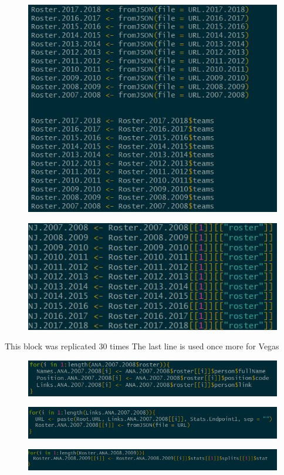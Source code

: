 \documentclass{beamer}
\begin{document}
\begin{frame}
\begin{figure}
	\includegraphics[width=0.7\linewidth]{Images/Block2}
\end{figure}

\end{frame}

\begin{frame}
\begin{figure}
	\includegraphics[width=0.7\linewidth]{Images/Block3}
\end{figure}
This block was replicated 30 times \newline
The last line is used once more for Vegas
\end{frame}

\begin{frame}
\begin{figure}
	\includegraphics[width=0.7\linewidth]{Images/Block4}
\end{figure}

\end{frame}

\begin{frame}
\begin{figure}
	\includegraphics[width=0.7\linewidth]{Images/Block5}
\end{figure}
\begin{figure}
	\includegraphics[width=0.7\linewidth]{Images/Block6}
\end{figure}

\end{frame}
\end{document}
